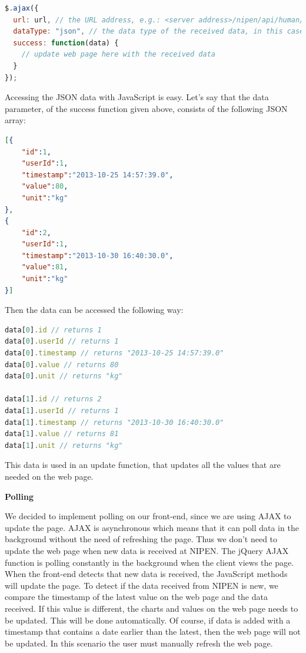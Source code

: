 \begin{lstlisting}[language=JavaScript]
$.ajax({
  url: url, // the URL address, e.g.: <server address>/nipen/api/human/weight
  dataType: "json", // the data type of the received data, in this case a JSON string
  success: function(data) {
    // update web page here with the received data
  }
});
\end{lstlisting}

Accessing the JSON data with JavaScript is easy.
Let's say that the data parameter, of the success function given above, consists of the following JSON array:

\begin{lstlisting}[language=json]
[{
    "id":1,
    "userId":1,
    "timestamp":"2013-10-25 14:57:39.0",
    "value":80,
    "unit":"kg"
},
{
    "id":2,
    "userId":1,
    "timestamp":"2013-10-30 16:40:30.0",
    "value":81,
    "unit":"kg"
}]
\end{lstlisting} 

Then the data can be accessed the following way:

\begin{lstlisting}[language=JavaScript]
data[0].id // returns 1
data[0].userId // returns 1
data[0].timestamp // returns "2013-10-25 14:57:39.0"
data[0].value // returns 80
data[0].unit // returns "kg"

data[1].id // returns 2
data[1].userId // returns 1
data[1].timestamp // returns "2013-10-30 16:40:30.0"
data[1].value // returns 81
data[1].unit // returns "kg"
\end{lstlisting}

This data is used in an update function, that updates all the values that are needed on the web page.

\textbf{Polling}

We decided to implement polling on our front-end, since we are using AJAX to update the page.
AJAX is asynchronous which means that it can poll data in the background without the need of refreshing the page.
Thus we don't need to update the web page when new data is received at NIPEN.
The jQuery AJAX function is polling constantly in the background when the client views the page.
When the front-end detects that new data is received, the JavaScript methods will update the page.
To detect if the data received from NIPEN is new, we compare the timestamp of the latest value on the web page and the data received.
If this value is different, the charts and values on the web page needs to be updated.
This will be done automatically.
Of course, if data is added with a timestamp that contains a date earlier than the latest, then the web page will not be updated.
In this scenario the user must manually refresh the web page.


